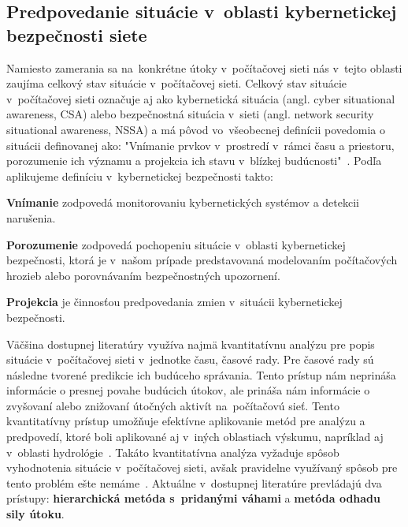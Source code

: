 \documentclass[thesismargins, thesislinespacing, openright, upjsfrontpage]{rnthesis}
\begin{document}
\subsection{Predpovedanie situácie v~oblasti kybernetickej bezpečnosti siete} \label{forecast}

Namiesto zamerania sa na~konkrétne útoky v~počítačovej sieti nás v~tejto oblasti zaujíma celkový stav situácie v~počítačovej sieti. Celkový stav situácie v~počítačovej sieti označuje aj ako kybernetická situácia (angl. cyber situational awareness, CSA) alebo bezpečnostná situácia v~sieti (angl. network security situational awareness, NSSA) a má pôvod vo~všeobecnej definícii povedomia o situácii definovanej ako:
"Vnímanie prvkov v~prostredí v~rámci času a priestoru, porozumenie ich významu a projekcia ich stavu v~blízkej budúcnosti"~\cite{Endsley1988}. Podľa \cite{Yang2014} aplikujeme definíciu v~kybernetickej bezpečnosti takto: 

\begin{compactenum}
    \item \textbf{Vnímanie} zodpovedá monitorovaniu kybernetických systémov a detekcii narušenia.
    \item \textbf{Porozumenie} zodpovedá pochopeniu situácie v~oblasti kybernetickej bezpečnosti, ktorá je v~našom prípade predstavovaná modelovaním počítačových hrozieb alebo porovnávaním bezpečnostných upozornení. 
    \item \textbf{Projekcia} je činnosťou predpovedania zmien v~situácii kybernetickej bezpečnosti. 
\end{compactenum}

Väčšina dostupnej literatúry využíva najmä kvantitatívnu analýzu pre popis situácie v~počítačovej sieti v~jednotke času, časové rady. Pre časové rady sú následne tvorené predikcie ich budúceho správania. Tento prístup nám neprináša informácie o presnej povahe budúcich útokov, ale prináša nám informácie o zvyšovaní alebo znižovaní útočných aktivít na~počítačovú sieť. Tento kvantitatívny prístup umožňuje efektívne aplikovanie metód pre analýzu a predpovedí, ktoré boli aplikované aj v~iných oblastiach výskumu, napríklad aj v~oblasti hydrológie~\cite{wang2009comparison}. Takáto kvantitatívna analýza vyžaduje spôsob vyhodnotenia situácie v~počítačovej sieti, avšak pravidelne využívaný spôsob pre tento problém ešte nemáme~\cite{husak2020preprint}. Aktuálne v~dostupnej literatúre prevládajú dva prístupy: \textbf{hierarchická metóda s~pridanými váhami} a \textbf{metóda odhadu sily útoku}. 
\end{document}
